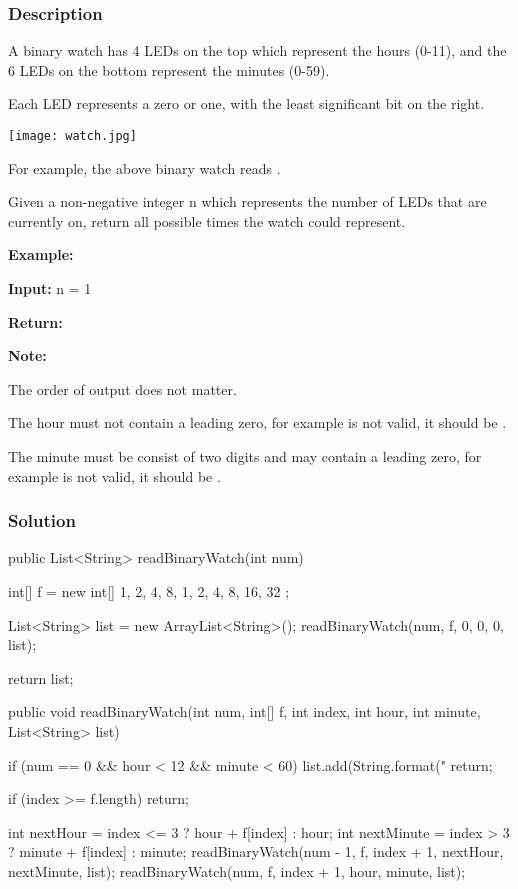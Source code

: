 \subsubsection{Description}

A binary watch has 4 LEDs on the top which represent the hours (0-11), and the 6 LEDs on the bottom represent the minutes (0-59).

Each LED represents a zero or one, with the least significant bit on the right.

\begin{center}
\texttt{[image: watch.jpg]}\\
\end{center}

For example, the above binary watch reads .

Given a non-negative integer n which represents the number of LEDs that are currently on, return all possible times the watch could represent.

\textbf{Example:}

\textbf{Input:} n = 1

\textbf{Return:} \code{["1:00", "2:00", "4:00", "8:00", "0:01", "0:02", "0:04", "0:08", "0:16", "0:32"]}

\textbf{Note:}

The order of output does not matter.

The hour must not contain a leading zero, for example  is not valid, it should be .

The minute must be consist of two digits and may contain a leading zero, for example  is not valid, it should be .

\subsubsection{Solution}
\begin{Code}
public List<String> readBinaryWatch(int num) {
    int[] f = new int[] {
            1, 2, 4, 8, 1, 2, 4, 8, 16, 32
    };

    List<String> list = new ArrayList<String>();
    readBinaryWatch(num, f, 0, 0, 0, list);

    return list;
}
\end{Code}

\newpage

\begin{Code}
public void readBinaryWatch(int num, int[] f, int index, int hour, int minute, List<String> list) {
    if (num == 0 && hour < 12 && minute < 60) {
        list.add(String.format("%
        return;
    }

    if (index >= f.length) {
        return;
    }

    int nextHour = index <= 3 ? hour + f[index] : hour;
    int nextMinute = index > 3 ? minute + f[index] : minute;
    readBinaryWatch(num - 1, f, index + 1, nextHour, nextMinute, list);
    readBinaryWatch(num, f, index + 1, hour, minute, list);
}
\end{Code}

